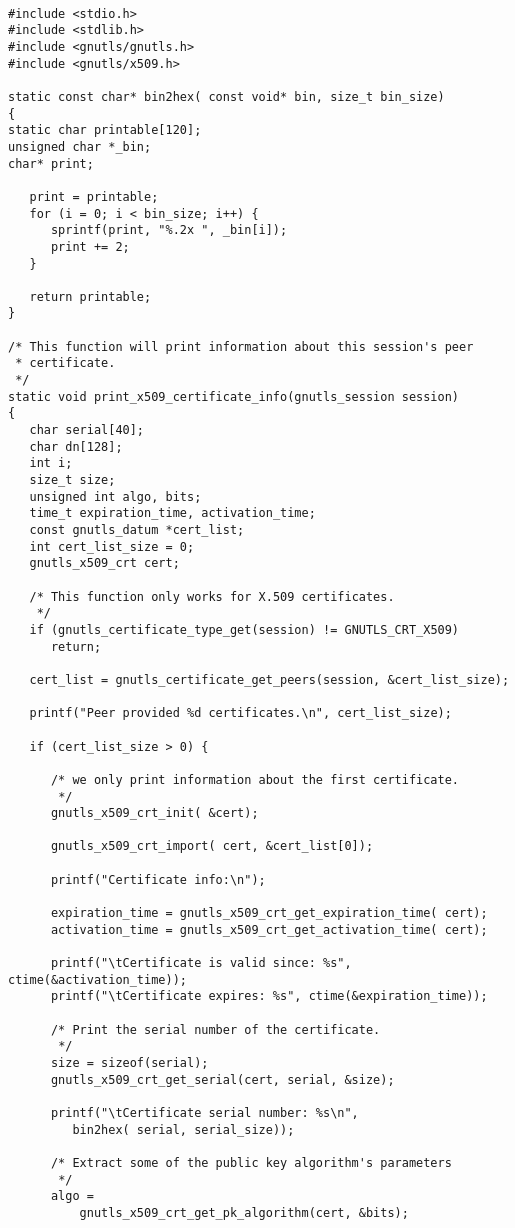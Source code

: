 \begin{verbatim}

#include <stdio.h>
#include <stdlib.h>
#include <gnutls/gnutls.h>
#include <gnutls/x509.h>

static const char* bin2hex( const void* bin, size_t bin_size)
{
static char printable[120];
unsigned char *_bin;
char* print;

   print = printable;
   for (i = 0; i < bin_size; i++) {
      sprintf(print, "%.2x ", _bin[i]);
      print += 2;
   }

   return printable;
}

/* This function will print information about this session's peer
 * certificate. 
 */
static void print_x509_certificate_info(gnutls_session session)
{
   char serial[40];
   char dn[128];
   int i;
   size_t size;
   unsigned int algo, bits;
   time_t expiration_time, activation_time;
   const gnutls_datum *cert_list;
   int cert_list_size = 0;
   gnutls_x509_crt cert;

   /* This function only works for X.509 certificates.
    */
   if (gnutls_certificate_type_get(session) != GNUTLS_CRT_X509)
      return;

   cert_list = gnutls_certificate_get_peers(session, &cert_list_size);

   printf("Peer provided %d certificates.\n", cert_list_size);

   if (cert_list_size > 0) {

      /* we only print information about the first certificate.
       */
      gnutls_x509_crt_init( &cert);

      gnutls_x509_crt_import( cert, &cert_list[0]);

      printf("Certificate info:\n");

      expiration_time = gnutls_x509_crt_get_expiration_time( cert);
      activation_time = gnutls_x509_crt_get_activation_time( cert);

      printf("\tCertificate is valid since: %s", ctime(&activation_time));
      printf("\tCertificate expires: %s", ctime(&expiration_time));

      /* Print the serial number of the certificate.
       */
      size = sizeof(serial);
      gnutls_x509_crt_get_serial(cert, serial, &size);

      printf("\tCertificate serial number: %s\n", 
         bin2hex( serial, serial_size));

      /* Extract some of the public key algorithm's parameters
       */
      algo =
          gnutls_x509_crt_get_pk_algorithm(cert, &bits);


\end{verbatim}
